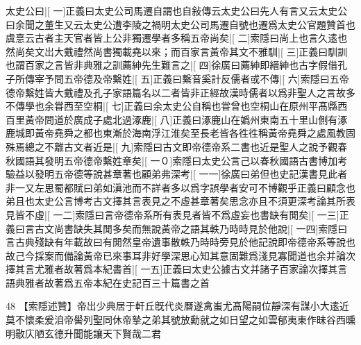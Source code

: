 太史公曰|[%
一]正義曰太史公司馬遷自謂也自敍傳云太史公曰先人有言又云太史公曰余聞之董生又云太史公遭李陵之禍明太史公司馬遷自號也遷爲太史公官題贊首也虞憙云古者主天官者皆上公非獨遷學者多稱五帝尚矣|[%
二]索隱曰尚上也言久逺也然尚矣文岀大戴禮然尚書獨載堯以來；而百家言黃帝其文不雅馴|[%
三]正義曰馴訓也謂百家之言皆非典雅之訓薦紳先生難言之|[%
四]徐廣曰薦紳即縉紳也古字假借孔子所傳宰予問五帝德及帝繫姓|[%
五]正義曰繫音奚計反儒者或不傳|[%
六]索隱曰五帝德帝繫姓皆大戴禮及孔子家語篇名以二者皆非正經故漢時儒者以爲非聖人之言故多不傳學也余甞西至空桐|[%
七]正義曰余太史公自稱也甞曾也空桐山在原州平髙縣西百里黃帝問道於廣成子處北過涿鹿|[%
八]正義曰涿鹿山在嬀州東南五十里山側有涿鹿城即黃帝堯舜之都也東漸於海南浮江淮矣至長老皆各徃徃稱黃帝堯舜之處風教固殊焉總之不離古文者近是|[%
九]索隱曰古文即帝德帝系二書也近是聖人之說予觀春秋國語其發明五帝德帝繫姓章矣|[%
一０]索隱曰太史公言己以春秋國語古書博加考驗益以發明五帝德等說甚章著也顧弟弗深考|[%
一一]徐廣曰弟但也史記漢書見此者非一又左思蜀都賦曰弟如滇池而不詳者多以爲字誤學者安可不博觀乎正義曰顧念也弟且也太史公言博考古文擇其言表見之不虛甚章著矣思念亦且不須更深考論其所表見皆不虛|[%
一二]索隱曰言帝德帝系所有表見者皆不爲虛妄也書缺有閒矣|[%
一三]正義曰言古文尚書缺失其閒多矣而無說黃帝之語其軼乃時時見於他說|[%
一四]索隱曰言古典殘缺有年載故曰有閒然皇帝遺事散軼乃時時旁見於他記說即帝德帝系等說也故己今採案而備論黃帝已來事耳非好學深思心知其意固難爲淺見寡聞道也余并論次擇其言尤雅者故著爲本紀書首|[%
一五]正義曰太史公據古文并諸子百家論次擇其言語典雅者故著爲五帝本紀在史記百三十篇書之首

48
【索隱述贊】帝岀少典居于軒丘旣代炎曆遂禽蚩尤髙陽嗣位靜深有謀小大逺近莫不懷柔爰洎帝嚳列聖同休帝摯之弟其號放勳就之如日望之如雲郁夷東作昧谷西曛明敭庂陋玄德升聞能讓天下賢哉二君

